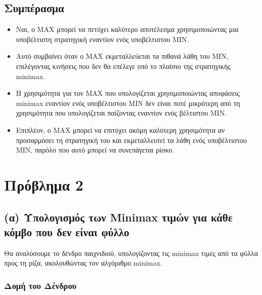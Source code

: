 \documentclass{article}
\begin{document}
\subsection*{Συμπέρασμα}

\begin{itemize}
    \item Ναι, ο MAX μπορεί να πετύχει καλύτερο αποτέλεσμα χρησιμοποιώντας μια υποβέλτιστη στρατηγική εναντίον ενός υποβέλτιστου MIN.
    \item Αυτό συμβαίνει όταν ο MAX εκμεταλλεύεται τα πιθανά λάθη του MIN, επιλέγοντας κινήσεις που δεν θα επέλεγε υπό το πλαίσιο της στρατηγικής minimax.

    \item Η χρησιμότητα για τον MAX που υπολογίζεται χρησιμοποιώντας αποφάσεις minimax εναντίον ενός υποβέλτιστου MIN δεν είναι ποτέ μικρότερη από τη χρησιμότητα που υπολογίζεται παίζοντας εναντίον ενός βέλτιστου MIN.
    \item Επιπλέον, ο MAX μπορεί να επιτύχει ακόμη καλύτερη χρησιμότητα αν προσαρμόσει τη στρατηγική του και εκμεταλλευτεί τα λάθη ενός υποβέλτιστου MIN, παρόλο που αυτό μπορεί να συνεπάγεται ρίσκο.
\end{itemize}


\section*{Πρόβλημα 2}

\subsection*{(α) Υπολογισμός των Minimax τιμών για κάθε κόμβο που δεν είναι φύλλο}

Θα αναλύσουμε το δένδρο παιχνιδιού, υπολογίζοντας τις minimax τιμές από τα φύλλα προς τη ρίζα, ακολουθώντας τον αλγόριθμο minimax.

\subsubsection*{Δομή του Δένδρου}
\end{document}
